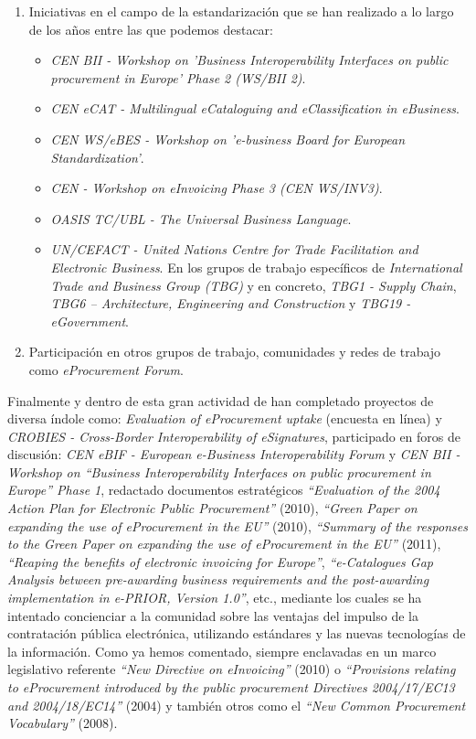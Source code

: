 \begin{enumerate}
\item Iniciativas en el campo de la estandarización que se han realizado
a lo largo de los años entre las que podemos destacar:
\begin{itemize}
 \item \textit{CEN BII - Workshop on 'Business Interoperability Interfaces on public procurement in Europe' Phase 2 (WS/BII 2)}.
\item \textit{CEN eCAT - Multilingual eCataloguing and eClassification in eBusiness}.
\item \textit{CEN WS/eBES - Workshop on 'e-business Board for European Standardization'}.
\item \textit{CEN - Workshop on eInvoicing Phase 3 (CEN WS/INV3)}.
\item \textit{OASIS TC/UBL - The Universal Business Language}.
 \item \textit{UN/CEFACT - United Nations Centre for Trade Facilitation and Electronic Business}. En los grupos de trabajo
específicos de \textit{International Trade and Business Group (TBG)} y en concreto, \textit{TBG1 - Supply Chain},
\textit{TBG6 – Architecture, Engineering and Construction} y \textit{TBG19 - \gls{eGovernment}}.
\end{itemize}

\item Participación en otros grupos de trabajo, comunidades y redes de trabajo como \textit{eProcurement Forum}.
\end{enumerate}

Finalmente y dentro de esta gran actividad de han completado proyectos de diversa índole como:
\textit{Evaluation of eProcurement uptake} (encuesta en línea) y \textit{CROBIES - Cross-Border Interoperability of eSignatures},
participado en foros de discusión: \textit{CEN eBIF - European e-Business Interoperability Forum} y
\textit{CEN BII - Workshop on ``Business Interoperability Interfaces on public procurement in Europe'' Phase 1}, redactado
documentos estratégicos \textit{``Evaluation of the 2004 Action Plan for Electronic Public Procurement''} (2010),
\textit{``Green Paper on expanding the use of eProcurement in the EU''} (2010), 
\textit{``Summary of the responses to the Green Paper on expanding the use of eProcurement in the EU''} (2011), 
\textit{``Reaping the benefits of electronic invoicing for Europe''}, \textit{``e-Catalogues Gap Analysis between pre-awarding business requirements 
and the post-awarding implementation in e-PRIOR, Version 1.0''}, etc., mediante los cuales se ha intentado
concienciar a la comunidad sobre las ventajas del impulso de la contratación pública electrónica, utilizando
estándares y las nuevas tecnologías de la información. Como ya hemos comentado, siempre enclavadas en un marco
legislativo referente \textit{``New Directive on eInvoicing''} (2010) o 
\textit{``Provisions relating to eProcurement introduced by the public procurement Directives 2004/17/EC13 and 2004/18/EC14''} (2004) y también
otros como el \textit{``New Common Procurement Vocabulary''} (2008).

